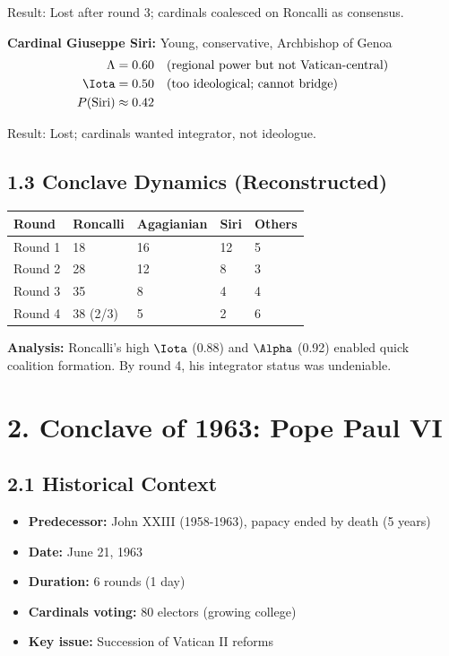 Result: Lost after round 3; cardinals coalesced on Roncalli as consensus.

\textbf{Cardinal Giuseppe Siri:} Young, conservative, Archbishop of Genoa
\begin{align*}
\Lambda &= 0.60 \quad \text{(regional power but not Vatican-central)} \\
\Iota &= 0.50 \quad \text{(too ideological; cannot bridge)} \\
P(\text{Siri}) &\approx 0.42
\end{align*}

Result: Lost; cardinals wanted integrator, not ideologue.

\subsection{1.3 Conclave Dynamics (Reconstructed)}

\begin{table}[h]
\centering
\begin{tabular}{|l|l|l|l|l|}
\hline
\textbf{Round} & \textbf{Roncalli} & \textbf{Agagianian} & \textbf{Siri} & \textbf{Others} \\
\hline
Round 1 & 18 & 16 & 12 & 5 \\
Round 2 & 28 & 12 & 8 & 3 \\
Round 3 & 35 & 8 & 4 & 4 \\
Round 4 & 38 (2/3) & 5 & 2 & 6 \\
\hline
\end{tabular}
\end{table}

\textbf{Analysis:} Roncalli's high $\Iota$ (0.88) and $\Alpha$ (0.92) enabled quick coalition formation. By round 4, his integrator status was undeniable.

\section{2. Conclave of 1963: Pope Paul VI}

\subsection{2.1 Historical Context}

\begin{itemize}
\item \textbf{Predecessor:} John XXIII (1958-1963), papacy ended by death (5 years)
\item \textbf{Date:} June 21, 1963
\item \textbf{Duration:} 6 rounds (1 day)
\item \textbf{Cardinals voting:} 80 electors (growing college)
\item \textbf{Key issue:} Succession of Vatican II reforms
\end{itemize}

